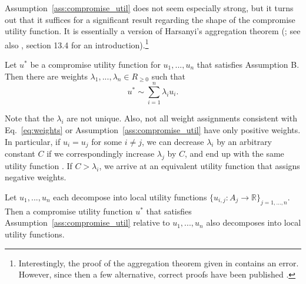 Assumption~\ref{ass:compromise_util} does not seem especially strong, but it turns out that it
suffices for a significant result regarding the shape of the compromise utility function. It is
essentially a version of Harsanyi's aggregation theorem (\cite{Harsanyi1955-ou}; see also
\cite{Peterson2017-pa}, section 13.4 for an introduction).\footnote{Interestingly, the proof of the
    aggregation theorem given in \parencite{Harsanyi1955-ou} contains an error. However, since then
    a few alternative, correct proofs have been published
    \parencite{Fishburn1984-zh,Border1985-mw,Hammond_undated-bp}.}

\begin{theorem}
\parencite{Resnik1983-hl,Fishburn1984-zh} Let \(u^{*}\) be
a compromise utility function for \(u_{1},...,u_{n}\) that satisfies
Assumption B. Then there are weights
\(\lambda_{1},...,\lambda_{n} \in R_{\geq 0}\) such that
\begin{equation}
    u^{*} \sim \sum_{i=1}^n\lambda_{i}u_{i}.
    \label{eq:weights}
\end{equation}
    \label{th:compromise}
\end{theorem}

Note that the \(\lambda_{i}\) are not unique. Also, not all weight
assignments consistent with Eq.~\eqref{eq:weights} or Assumption~\ref{ass:compromise_util} have only positive
weights. In particular, if \(u_{i} = u_{j}\) for some \(i \neq j\), we
can decrease \(\lambda_{i}\) by an arbitrary constant \(C\) if we
correspondingly increase \(\lambda_{j}\) by \(C\), and end up with the
same utility function
\parencite{Resnik1983-hl,Fishburn1984-zh}. If
\(C > \lambda_{i}\), we arrive at an equivalent utility function that
assigns negative weights.


\begin{theorem}
Let \(u_{1},...,u_{n}\) each decompose into local utility functions \(\{{ u}_{i,j}:A_{j} \rightarrow
\mathbb{R}\}_{j = 1,...,n}\).  Then a compromise utility function \(u^{*}\) that satisfies
Assumption~\ref{ass:compromise_util} relative to \(u_{1},...,u_{n}\) also decomposes into local
utility functions.
    \label{th:decompose}
\end{theorem}

